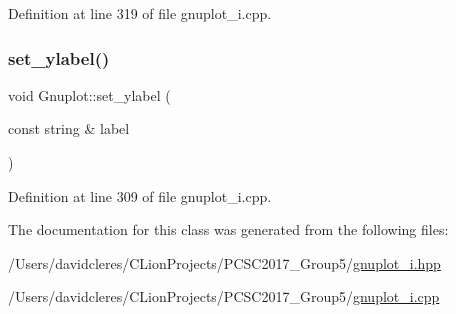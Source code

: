 Definition at line 319 of file gnuplot\+\_\+i.\+cpp.

\mbox{\label{class_gnuplot_af85dd1d368699914112460285ead0fde}} 
\subsubsection{\texorpdfstring{set\+\_\+ylabel()}{set\_ylabel()}}
{\footnotesize\ttfamily void Gnuplot\+::set\+\_\+ylabel (\begin{DoxyParamCaption}\item[{const string \&}]{label }\end{DoxyParamCaption})}



Definition at line 309 of file gnuplot\+\_\+i.\+cpp.



The documentation for this class was generated from the following files\+:\begin{DoxyCompactItemize}
\item 
/\+Users/davidcleres/\+C\+Lion\+Projects/\+P\+C\+S\+C2017\+\_\+\+Group5/\mbox{\hyperlink{gnuplot__i_8hpp}{gnuplot\+\_\+i.\+hpp}}\item 
/\+Users/davidcleres/\+C\+Lion\+Projects/\+P\+C\+S\+C2017\+\_\+\+Group5/\mbox{\hyperlink{gnuplot__i_8cpp}{gnuplot\+\_\+i.\+cpp}}\end{DoxyCompactItemize}
